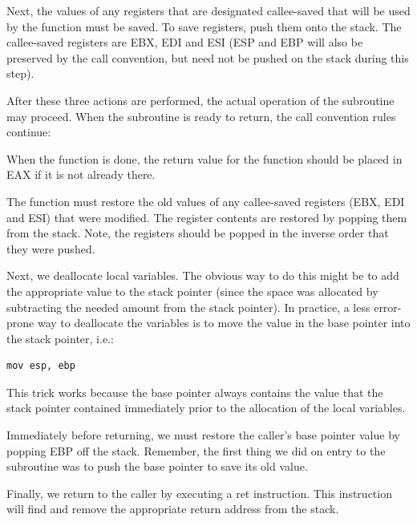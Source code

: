 \begin{numlist}
\item Next, the values of any registers that are designated
  callee-saved that will be used by the function must be saved. To
  save registers, push them onto the stack. The callee-saved registers
  are EBX, EDI and ESI (ESP and EBP will also be preserved by the call
  convention, but need not be pushed on the stack during this step).

  After these three actions are performed, the actual operation of the
  subroutine may proceed.  When the subroutine is ready to return, the
  call convention rules continue:

\item When the function is done, the return value for the function
  should be placed in EAX if it is not already there.

\item The function must restore the old values of any callee-saved
  registers (EBX, EDI and ESI) that were modified. The register contents
  are restored by popping them from the stack. Note, the registers
  should be popped in the inverse order that they were pushed.

\item Next, we deallocate local variables. The obvious way to do this
  might be to add the appropriate value to the stack pointer (since
  the space was allocated by subtracting the needed amount from the
  stack pointer). In practice, a less error-prone way to deallocate
  the variables is to move the value in the base pointer into the
  stack pointer, i.e.:

\begin{lstlisting}[backgroundcolor=\color{white},frame=trBL,linewidth=3.75in,xleftmargin=2.25in,label={x86-callee-code-3.lst},language={[x86masm]Assembler},caption={x86 callee code, part 3}]
mov esp, ebp
\end{lstlisting}

This trick works because the base pointer always contains the value
that the stack pointer contained immediately prior to the allocation
of the local variables.

\item Immediately before returning, we must restore the caller's base
  pointer value by popping EBP off the stack. Remember, the first
  thing we did on entry to the subroutine was to push the base pointer
  to save its old value.

\item Finally, we return to the caller by executing a ret instruction. This instruction will find and
remove the appropriate return address from the stack.

\end{numlist}

